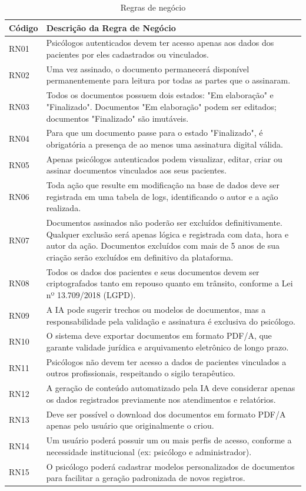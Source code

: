 \begin{table}[H]
\centering
\caption{Regras de negócio}
\begin{tabular}{@{}lp{13cm}@{}}
\toprule
\rowcolor[HTML]{EFEFEF} 
\textbf{Código} & \textbf{Descrição da Regra de Negócio} \\ \midrule
RN01 & Psicólogos autenticados devem ter acesso apenas aos dados dos pacientes por eles cadastrados ou vinculados. \\
RN02 & Uma vez assinado, o documento permanecerá disponível permanentemente para leitura por todas as partes que o assinaram. \\
RN03 & Todos os documentos possuem dois estados: "Em elaboração" e "Finalizado". Documentos "Em elaboração" podem ser editados; documentos "Finalizado" são imutáveis. \\
RN04 & Para que um documento passe para o estado "Finalizado", é obrigatória a presença de ao menos uma assinatura digital válida. \\
RN05 & Apenas psicólogos autenticados podem visualizar, editar, criar ou assinar documentos vinculados aos seus pacientes. \\
RN06 & Toda ação que resulte em modificação na base de dados deve ser registrada em uma tabela de logs, identificando o autor e a ação realizada. \\
RN07 & Documentos assinados não poderão ser excluídos definitivamente. Qualquer exclusão será apenas lógica e registrada com data, hora e autor da ação. Documentos excluídos com mais de 5 anos de sua criação serão excluídos em definitivo da plataforma. \\
RN08 & Todos os dados dos pacientes e seus documentos devem ser criptografados tanto em repouso quanto em trânsito, conforme a Lei nº 13.709/2018 (LGPD). \\
RN09 & A IA pode sugerir trechos ou modelos de documentos, mas a responsabilidade pela validação e assinatura é exclusiva do psicólogo. \\
RN10 & O sistema deve exportar documentos em formato PDF/A, que garante validade jurídica e arquivamento eletrônico de longo prazo. \\
RN11 & Psicólogos não devem ter acesso a dados de pacientes vinculados a outros profissionais, respeitando o sigilo terapêutico. \\
RN12 & A geração de conteúdo automatizado pela IA deve considerar apenas os dados registrados previamente nos atendimentos e relatórios. \\
RN13 & Deve ser possível o download dos documentos em formato PDF/A apenas pelo usuário que originalmente o criou. \\
RN14 & Um usuário poderá possuir um ou mais perfis de acesso, conforme a necessidade institucional (ex: psicólogo e administrador). \\
RN15 & O psicólogo poderá cadastrar modelos personalizados de documentos para facilitar a geração padronizada de novos registros. \\
\bottomrule
\end{tabular}
\label{tab:regras_negocio}
\end{table}

